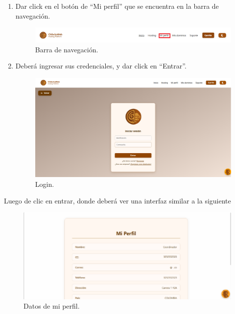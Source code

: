 \begin{enumerate}
	\item Dar click en el botón de “Mi perfil” que se encuentra en la barra de navegación.
	\begin{figure}[H]
		\includegraphics[width=\columnwidth]{acceso/navbar-perfil.png}
		\caption{Barra de navegación.}
		\label{fig:navbar-perfil}
	\end{figure}
    \item Deberá ingresar sus credenciales, y dar click en “Entrar”.
    \begin{figure}[H]
        \centering
  		\includegraphics[width=\columnwidth]{acceso/login.png}
  		\caption{Login.}
  		\label{fig:login}
   	\end{figure}
\end{enumerate}

Luego de clic en entrar, donde deberá ver una interfaz similar a la siguiente

\begin{figure}[H]
    \centering
    \includegraphics[width=\columnwidth]{acceso/perfil.png}
    \caption{Datos de mi perfil.}
    \label{fig:placeholder}
\end{figure}
